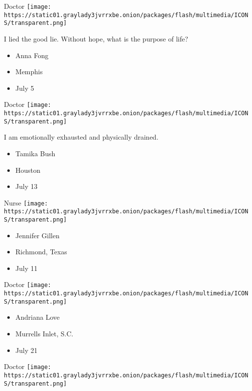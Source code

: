 \protect\hyperlink{item-anna-fong}{}

Doctor
\texttt{[image: https://static01.graylady3jvrrxbe.onion/packages/flash/multimedia/ICONS/transparent.png]}

I lied the good lie. Without hope, what is the purpose of life?

\begin{itemize}
\tightlist
\item
  Anna Fong
\item
  Memphis
\item
  July 5
\end{itemize}

\protect\hyperlink{item-tamika-bush}{}

Doctor
\texttt{[image: https://static01.graylady3jvrrxbe.onion/packages/flash/multimedia/ICONS/transparent.png]}

I am emotionally exhausted and physically drained.

\begin{itemize}
\tightlist
\item
  Tamika Bush
\item
  Houston
\item
  July 13
\end{itemize}

\protect\hyperlink{item-jennifer-gillen}{}

Nurse
\texttt{[image: https://static01.graylady3jvrrxbe.onion/packages/flash/multimedia/ICONS/transparent.png]}

\begin{itemize}
\tightlist
\item
  Jennifer Gillen
\item
  Richmond, Texas
\item
  July 11
\end{itemize}

\protect\hyperlink{item-andriana-love}{}

Doctor
\texttt{[image: https://static01.graylady3jvrrxbe.onion/packages/flash/multimedia/ICONS/transparent.png]}

\begin{itemize}
\tightlist
\item
  Andriana Love
\item
  Murrells Inlet, S.C.
\item
  July 21
\end{itemize}

\protect\hyperlink{item-absar-mirza}{}

Doctor
\texttt{[image: https://static01.graylady3jvrrxbe.onion/packages/flash/multimedia/ICONS/transparent.png]}

